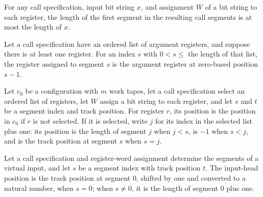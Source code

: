 \begin{lemma}
\label{Complexity.LogProg.wlen_zero_le}
\leanok
{}
For any call specification, input bit string $x$, and assignment $W$ of a bit string to
each register, the length of the first segment in the resulting call segments is at most
the length of $x$.
\end{lemma}

\begin{lemma}
\label{Complexity.LogProg.segReg_eq}
\leanok
{}
Let a call specification have an ordered list of argument registers, and suppose there
is at least one register. For an index $s$ with $0<s\le$ the length of that list, the
register assigned to segment $s$ is the argument register at zero-based position $s-1$.
\end{lemma}

\begin{definition}
\label{Complexity.LogProg.regPos}
\leanok
{}
Let $c_0$ be a configuration with $m$ work tapes, let a call specification select an
ordered list of registers, let $W$ assign a bit string to each register, and let $s$ and
$t$ be a segment index and track position. For register $r$, its position is the
position in $c_0$ if $r$ is not selected. If it is selected, write $j$ for its index in
the selected list plus one: its position is the length of segment $j$ when $j<s$, is
$-1$ when $s<j$, and is the track position at segment $s$ when $s=j$.
\end{definition}

\begin{definition}
\label{Complexity.LogProg.inPos}
\leanok
{}
Let a call specification and register-word assignment determine the segments of a
virtual input, and let $s$ be a segment index with track position $t$. The input-head
position is the track position at segment $0$, shifted by one and converted to a natural
number, when $s=0$; when $s\ne0$, it is the length of segment $0$ plus one.
\end{definition}

